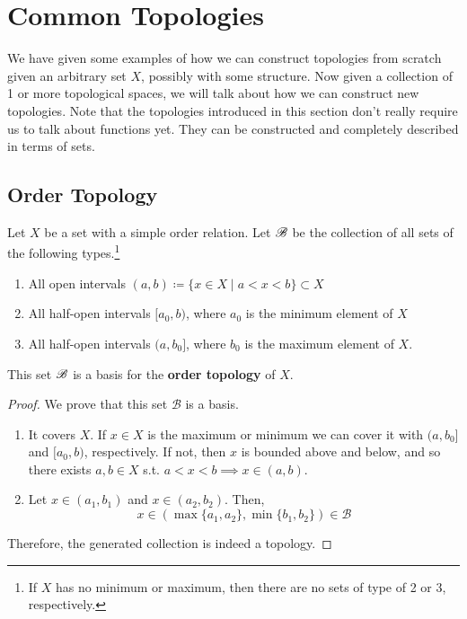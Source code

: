 \section{Common Topologies} 

  We have given some examples of how we can construct topologies from scratch given an arbitrary set $X$, possibly with some structure. Now given a collection of 1 or more topological spaces, we will talk about how we can construct new topologies. Note that the topologies introduced in this section don't really require us to talk about functions yet. They can be constructed and completely described in terms of sets. 

\subsection{Order Topology}

  \begin{definition}
    \label{def:order-topology}
    Let $X$ be a set with a simple order relation. Let $\B$ be the collection of all sets of the following types.\footnote{If $X$ has no minimum or maximum, then there are no sets of type of 2 or 3, respectively.}
    \begin{enumerate}
      \item All open intervals $(a, b) \coloneqq \{x \in X \mid a < x < b\} \subset X$
      \item All half-open intervals $[a_0, b)$, where $a_0$ is the minimum element of $X$
      \item All half-open intervals $(a, b_0]$, where $b_0$ is the maximum element of $X$. 
    \end{enumerate}
    This set $\B$ is a basis for the \textbf{order topology} of $X$. 
  \end{definition}
  \begin{proof}
    We prove that this set $\mathscr{B}$ is a basis. 
    \begin{enumerate}
      \item It covers $X$. If $x \in X$ is the maximum or minimum we can cover it with $(a, b_0]$ and $[a_0, b)$, respectively. If not, then $x$ is bounded above and below, and so there exists $a, b \in X$ s.t. $a < x < b \implies x \in (a, b)$. 

      \item Let $x \in (a_1, b_1)$ and $x \in (a_2, b_2)$. Then, 
      \begin{equation}
        x \in (\max\{a_1, a_2\}, \min\{b_1, b_2\}) \in \mathscr{B} 
      \end{equation}
    \end{enumerate}
    Therefore, the generated collection is indeed a topology. 
  \end{proof}

